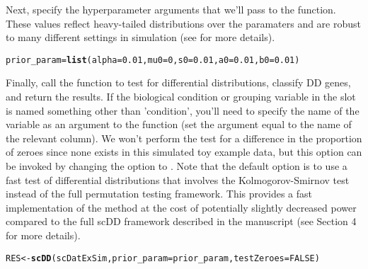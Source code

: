\documentclass{article}\usepackage[]{graphicx}\usepackage[]{color}
\makeatletter
\newcommand{\hlnum}[1]{\textcolor[rgb]{0.686,0.059,0.569}{#1}}%
\newcommand{\hlstd}[1]{\textcolor[rgb]{0.345,0.345,0.345}{#1}}%
\newcommand{\hlkwb}[1]{\textcolor[rgb]{0.69,0.353,0.396}{#1}}%
\newcommand{\hlkwc}[1]{\textcolor[rgb]{0.333,0.667,0.333}{#1}}%
\newcommand{\hlkwd}[1]{\textcolor[rgb]{0.737,0.353,0.396}{\textbf{#1}}}%
\newenvironment{kframe}{%
 \def\at@end@of@kframe{}%
 \ifinner\ifhmode%
  \def\at@end@of@kframe{\end{minipage}}%
  \begin{minipage}{\columnwidth}%
 \fi\fi%
 \def\FrameCommand##1{\hskip\@totalleftmargin \hskip-\fboxsep
 \colorbox{shadecolor}{##1}\hskip-\fboxsep
     \hskip-\linewidth \hskip-\@totalleftmargin \hskip\columnwidth}%
 \MakeFramed {\advance\hsize-\width
   \@totalleftmargin\z@ \linewidth\hsize
   \@setminipage}}%
 {\par\unskip\endMakeFramed%
 \at@end@of@kframe}
\newenvironment{knitrout}{}{} %
\makeatother
\begin{document}
Next, specify the hyperparameter arguments that we'll pass to the  function.  These values reflect heavy-tailed distributions over the paramaters and are robust to many different settings in simulation (see \cite{korthauer2015} for more details).

\begin{knitrout}
\color{fgcolor}\begin{kframe}
\begin{alltt}
\hlstd{prior_param}\hlkwb{=}\hlkwd{list}\hlstd{(}\hlkwc{alpha}\hlstd{=}\hlnum{0.01}\hlstd{,} \hlkwc{mu0}\hlstd{=}\hlnum{0}\hlstd{,} \hlkwc{s0}\hlstd{=}\hlnum{0.01}\hlstd{,} \hlkwc{a0}\hlstd{=}\hlnum{0.01}\hlstd{,} \hlkwc{b0}\hlstd{=}\hlnum{0.01}\hlstd{)}
\end{alltt}
\end{kframe}
\end{knitrout}
 
Finally, call the  function to test for differential distributions, classify DD genes, and return the results.  If the biological condition or grouping variable in the  slot is named something other than 'condition', you'll need to specify the name of the variable as an argument to the  function (set the  argument equal to the name of the relevant column).  We won't perform the test for a difference in the proportion of zeroes since none exists in this simulated toy example data, but this option can be invoked by changing the  option to .  Note that the default option is to use a fast test of differential distributions that involves the Kolmogorov-Smirnov test instead of the full permutation testing framework.  This provides a fast implementation of the method at the cost of potentially slightly decreased power compared to the full scDD framework described in the manuscript (see Section 4 for more details).

\begin{knitrout}
\color{fgcolor}\begin{kframe}
\begin{alltt}
\hlstd{RES} \hlkwb{<-} \hlkwd{scDD}\hlstd{(scDatExSim,} \hlkwc{prior_param}\hlstd{=prior_param,} \hlkwc{testZeroes}\hlstd{=}\hlnum{FALSE}\hlstd{)}
\end{alltt}


{\ttfamily\noindent\itshape\color{messagecolor}{\#\# Clustering observed expression data for each gene}}

{\ttfamily\noindent\itshape\color{messagecolor}{\#\# Setting up parallel back-end using 4 cores}}

{\ttfamily\noindent\itshape\color{messagecolor}{\#\# Notice! Number of permutations is set to zero; using Kolmogorov-Smirnov to test for differences in distributions instead of the Bayes Factor permutation test}}

{\ttfamily\noindent\itshape\color{messagecolor}{\#\# Classifying significant genes into patterns}}\end{kframe}
\end{knitrout}
\end{document}
